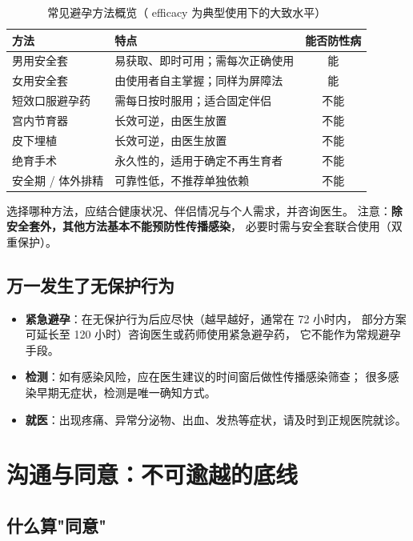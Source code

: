 \documentclass[12pt,UTF8,openany]{ctexbook}
\begin{document}
\begin{table}[htbp]
  \centering
  \caption{常见避孕方法概览（ efficacy 为典型使用下的大致水平）}
  \begin{tabularx}{\textwidth}{@{}l X C@{}}
    \toprule
    \textbf{方法} & \textbf{特点} & \textbf{能否防性病} \\
    \midrule
    男用安全套   & 易获取、即时可用；需每次正确使用 & 能 \\
    女用安全套   & 由使用者自主掌握；同样为屏障法   & 能 \\
    短效口服避孕药 & 需每日按时服用；适合固定伴侣   & 不能 \\
    宫内节育器   & 长效可逆，由医生放置           & 不能 \\
    皮下埋植     & 长效可逆，由医生放置           & 不能 \\
    绝育手术     & 永久性的，适用于确定不再生育者 & 不能 \\
    安全期 / 体外排精 & 可靠性低，不推荐单独依赖 & 不能 \\
    \bottomrule
  \end{tabularx}
\end{table}

选择哪种方法，应结合健康状况、伴侣情况与个人需求，并咨询医生。
注意：\textbf{除安全套外，其他方法基本不能预防性传播感染}，
必要时需与安全套联合使用（双重保护）。

\section{万一发生了无保护行为}

\begin{itemize}
  \item \textbf{紧急避孕}：在无保护行为后应尽快（越早越好，通常在 72 小时内，
        部分方案可延长至 120 小时）咨询医生或药师使用紧急避孕药，
        它不能作为常规避孕手段。
  \item \textbf{检测}：如有感染风险，应在医生建议的时间窗后做性传播感染筛查；
        很多感染早期无症状，检测是唯一确知方式。
  \item \textbf{就医}：出现疼痛、异常分泌物、出血、发热等症状，请及时到正规医院就诊。
\end{itemize}

\chapter{沟通与同意：不可逾越的底线}

\section{什么算"同意"}
\end{document}
